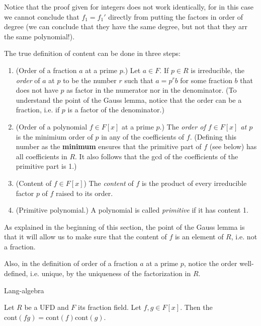 \begin{remark}
\label{remark-not-the-same-as-in-Z}
Notice that the proof given for integers does not work identically,
for in this case we cannot conclude that $f_1=f_1'$ directly from putting the
factors in order of degree (we can conclude that they have the same degree, but
not that they arr the same polynomial!).
\end{remark}

\medskip\noindent
The true definition of content can be done in three steps:
\begin{definition}
\label{definition-content}
\begin{reference}
\cite[p. 181]{Lang-algebra}
\end{reference}
\begin{enumerate}
\item (Order of a fraction $a$ at a prime $p$.) 
Let $a \in F$. If $p \in R$ is irreducible, the {\it order} of $a$ at $p$
to be the number $r$ such that $a=p^rb$ for some fraction $b$ that does not have
$p$ as factor in the numerator nor in the denominator. (To understand the point
of the Gauss lemma, notice that the order
can be a fraction, i.e. if $p$ is a factor of the denominator.)
\item (Order of a polynomial $f \in F[x]$ at a prime $p$.) 
The {\it  order of $f\in F[x]$ at $p$} is the minimium order of
$p$ in any of the coefficients of $f$. (Defining this number as the {\bf
minimum} ensures that the primitive part of $f$ (see below) has all coefficients
in $R$. It also follows that the gcd of the 
coefficients of the primitive part is 1.)
\item (Content of $f \in F[x]$) The {\it content} of $f$ is the product
of every irreducible factor $p$ of $f$ raised to its order.
\item (Primitive polynomial.) A polynomial is
called {\it primitive} if it has content 1.
\end{enumerate}
\end{definition}

As explained in the beginning of this section, the point of the Gauss
lemma is that it will allow us to make sure that the content of $f$ is an
element of $R$, i.e. not a fraction.

Also, in the definition of order of a fraction $a$ at a prime $p$, notice
 the order well-defined, i.e. unique, by the uniqueness of the factorization
in $R$.

\begin{lemma}
\label{lemma-true-Gauss}
\begin{reference}
\cite{Chapter 4, Theorem 2.1}{Lang-algebra}
\end{reference}
Let $R$ be a UFD and $F$ its fraction field. Let $f,g\in F[x]$. Then the
$\text{cont}(fg)=\text{cont}(f)\text{cont}(g)$.
\end{lemma}

